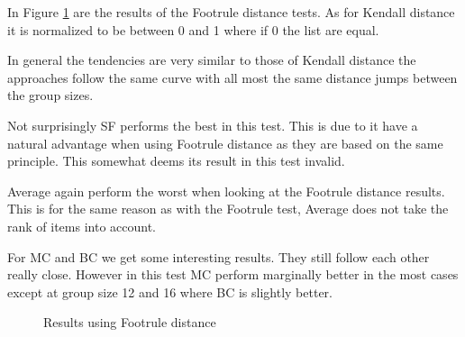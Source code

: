 In Figure \ref{fig:footruledistance} are the results of the Footrule distance tests. As for Kendall distance it is normalized to be between 0 and 1 where if 0 the list are equal. 

In general the tendencies are very similar to those of Kendall distance the approaches follow the same curve with all most the same distance jumps between the group sizes. 

Not surprisingly SF performs the best in this test. This is due to it have a natural advantage when using Footrule distance as they are based on the same principle. This somewhat deems its result in this test invalid. 

Average again perform the worst when looking at the Footrule distance results. This is for the same reason as with the Footrule test, Average does not take the rank of items into account.

For MC and BC we get some interesting results. They still follow each other really close. However in this test MC perform marginally better in the most cases except at group size 12 and 16 where BC is slightly better.

\begin{figure}[H]
\caption{Results using Footrule distance} \label{fig:footruledistance}
\end{figure}
